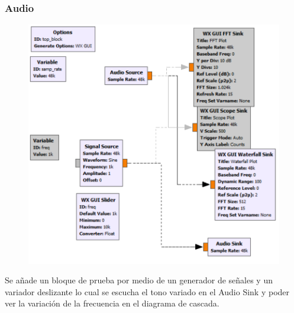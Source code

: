 \begin{frame}[fragile]
\frametitle{Audio}
\justifying

\begin{figure}

\begin{center}
\includegraphics[scale=0.35]{lab3/pdf/lab38.pdf}

\end{center}

\end{figure}

\justifying
Se añade un bloque de prueba por medio de un generador de
señales y un variador deslizante lo cual se escucha el tono variado
en el Audio Sink y poder ver la variación de la frecuencia en el
diagrama de cascada.

\end{frame}

